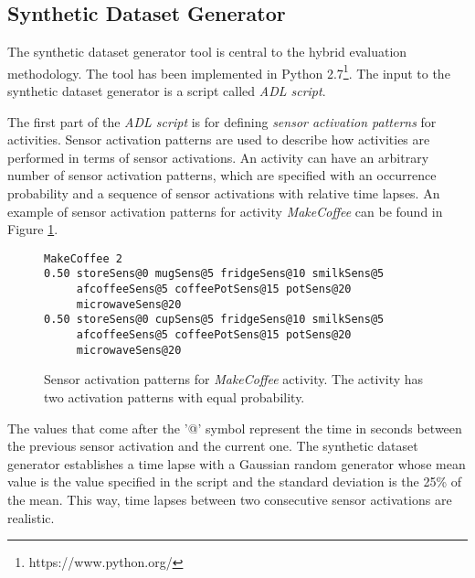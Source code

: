 \subsection{Synthetic Dataset Generator}
\begin{comment}
 - Explain the script: sensor activation patterns, activity patterns (sequences and alterations), sensor positive noise
 - Explain probabilistic sensor modelling
 - Explain probabilistic time lapses
 - Show output examples and give numbers
\end{comment}
The synthetic dataset generator tool is central to the hybrid evaluation methodology. The tool has been implemented in Python 2.7\footnote{https://www.python.org/}. The input to the synthetic dataset generator is a script called \textit{ADL script}. 

The first part of the \textit{ADL script} is for defining \textit{sensor activation patterns} for activities. Sensor activation patterns are used to describe how activities are performed in terms of sensor activations. An activity can have an arbitrary number of sensor activation patterns, which are specified with an occurrence probability and a sequence of sensor activations with relative time lapses. An example of sensor activation patterns for activity \textit{MakeCoffee} can be found in Figure \ref{fig:sensor-act}.

\begin{figure}
\begin{small}
\lstset{linewidth=\textwidth}
\begin{lstlisting}
MakeCoffee 2
0.50 storeSens@0 mugSens@5 fridgeSens@10 smilkSens@5 
     afcoffeeSens@5 coffeePotSens@15 potSens@20 
     microwaveSens@20
0.50 storeSens@0 cupSens@5 fridgeSens@10 smilkSens@5 
     afcoffeeSens@5 coffeePotSens@15 potSens@20 
     microwaveSens@20
\end{lstlisting}
\end{small}
\caption{Sensor activation patterns for \textit{MakeCoffee} activity. The activity has two activation patterns with equal probability.}
\label{fig:sensor-act}
\end{figure}

The values that come after the '@' symbol represent the time in seconds between the previous sensor activation and the current one. The synthetic dataset generator establishes a time lapse with a Gaussian random generator whose mean value is the value specified in the script and the standard deviation is the 25\% of the mean. This way, time lapses between two consecutive sensor activations are realistic. 

